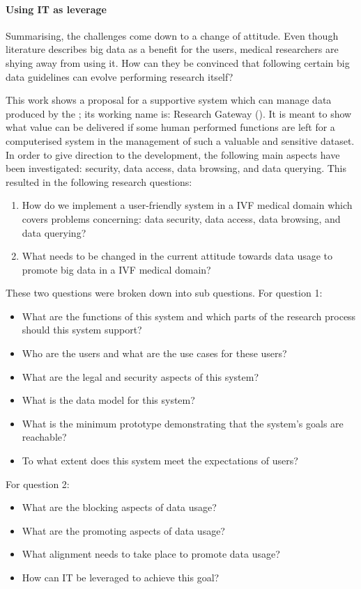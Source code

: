 \paragraph{Using IT as leverage}
Summarising, the challenges come down to a change of attitude.
Even though literature describes big data as a benefit for the users, medical researchers are shying away from using it.
How can they be convinced that following certain big data guidelines can evolve performing research itself?

This work shows a proposal for a supportive system which can manage data produced by the \project{}; its working name is: \project{} Research Gateway (\ivfsystem{}).
It is meant to show what value can be delivered if some human performed functions are left for a computerised system in the management of such a valuable and sensitive dataset.
In order to give direction to the development, the following main aspects have been investigated: security, data access, data browsing, and data querying.
This resulted in the following research questions:

\begin{enumerate}
	\item How do we implement a user-friendly system in a IVF medical domain which covers problems concerning: data security, data access, data browsing, and data querying?
	\item What needs to be changed in the current attitude towards data usage to promote big data in a IVF medical domain?
\end{enumerate}

These two questions were broken down into sub questions. 
For question 1:
\begin{itemize}
	\item What are the functions of this system and which parts of the research process should this system support?
	\item Who are the users and what are the use cases for these users?
	\item What are the legal and security aspects of this system?
	\item What is the data model for this system?
	\item What is the minimum prototype demonstrating that the system's goals are reachable? 
	\item To what extent does this system meet the expectations of users?
\end{itemize}

For question 2:
\begin{itemize}
	\item What are the blocking aspects of data usage?
	\item What are the promoting aspects of data usage?
	\item What alignment needs to take place to promote data usage?
	\item How can IT be leveraged to achieve this goal?
\end{itemize}